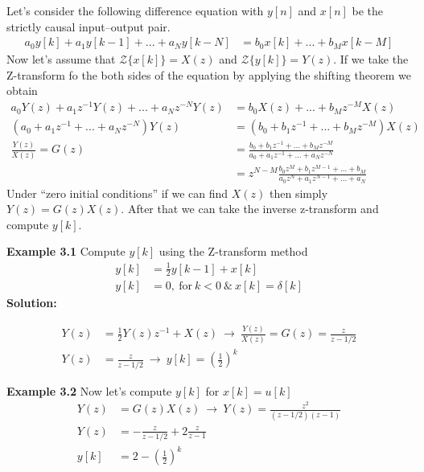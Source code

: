 \documentclass[twoside]{article}
\begin{document}
Let's consider the following difference equation with $y[n]$
and $x[n]$ be the strictly causal input--output pair.
%
\begin{align*}
a_0  y[k] + a_{1}  y[k-1] + ... + a_N y[k-N] &= b_{0}  x[k] + ... +
                                               b_M x[k-M] 
\end{align*}
%
Now let's assume that $\mathcal{Z}\lbrace x[k] \rbrace = X(z)$ and
$\mathcal{Z}\lbrace y[k] \rbrace = Y(z)$. If we take the Z-transform
fo the both sides of the equation by applying the shifting theorem 
we obtain
%
\begin{align*}
a_0 Y(z) + a_{1} z^{-1}  Y(z) + ... + a_N z^{-N} Y(z) &= 
b_{0}  X(z) + ... + b_M z^{-M} X(z)
\\
( a_0 + a_{1} z^{-1} + ... + a_N z^{-N} ) Y(z) &= 
( b_0 + b_{1} z^{-1} + ... + b_M z^{-M} ) X(z)
\\
\frac{Y(z)}{X(z)} = G(z) &= 
\frac{b_0 + b_{1} z^{-1} + ... + b_M z^{-M}}{a_0 + a_{1} z^{-1} + ... + a_N z^{-N}}
\\ &= 
z^{N-M} 
\frac{b_0 z^{M} + b_{1} z^{M-1} + ... + b_M}{a_0 z^{N} + a_{1} z^{N-1} + ... + a_N}
\end{align*}
%
Under ``zero initial conditions'' if we can find $X(z)$ then simply
$Y(z) = G(z) X(z)$. After that we can take the inverse z-transform 
and compute $y[k]$.

\textbf{Example 3.1} Compute $y[k]$ using the Z-transform method
%
\begin{align*}
y[k] &= \frac{1}{2} y[k-1] + x[k]  \\
y[k] &= 0 , \ \mathrm{for} \ k < 0  \ \& \ x[k] = \delta[k]
\end{align*}
%
\textbf{Solution:}

\begin{align*}
Y(z) &= \frac{1}{2} Y(z)z^{-1} + X(z) \  \rightarrow \
       \frac{Y(z)}{X(z)} = G(z) = \frac{z}{z - 1/2}  \\
Y(z) &= \frac{z}{z - 1/2} \ \rightarrow \ y[k] = \left( \frac{1}{2} \right)^k
\end{align*}

\textbf{Example 3.2} Now let's compute $y[k]$ for $x[k] = u[k]$
%
\begin{align*}
Y(z) &= G(z)  X(z) \  \rightarrow \ Y(z) = \frac{z^2}{(z - 1/2)(z-1)}
\\
Y(z) &= - \frac{z}{z - 1/2} + 2\frac{z}{z - 1}
\\
y[k] &= 2 - \left( \frac{1}{2} \right)^k
\end{align*}
\end{document}
